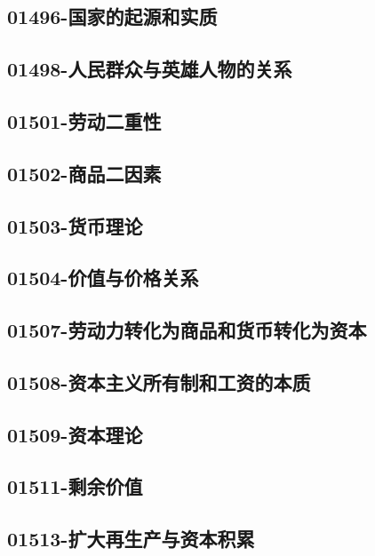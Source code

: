 \subsection{01496-国家的起源和实质}

\subsection{01498-人民群众与英雄人物的关系}

\subsection{01501-劳动二重性}

\subsection{01502-商品二因素}

\subsection{01503-货币理论}

\subsection{01504-价值与价格关系}

\subsection{01507-劳动力转化为商品和货币转化为资本}

\subsection{01508-资本主义所有制和工资的本质}

\subsection{01509-资本理论}

\subsection{01511-剩余价值}

\subsection{01513-扩大再生产与资本积累}

